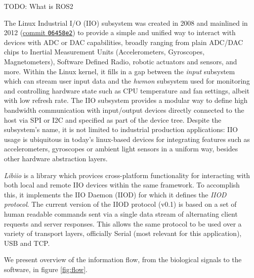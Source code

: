 \documentclass{thesis}
\newcommand{\todo}[1]{{\color{red}TODO: #1}}
\begin{document}
\todo{What is ROS2}

The Linux Industrial I/O (IIO) subsystem was created in 2008 and mainlined in 2012 (\href{https://github.com/torvalds/linux/commit/06458e277eac2b8761b0a04d3c808d57be281a2e}{commit \texttt{06458e2}}) to provide a simple and unified way to interact with devices with ADC or DAC capabilities, broadly ranging from plain ADC/DAC chips to Inertial Measurement Units (Accelerometers, Gyroscopes, Magnetometers), Software Defined Radio, robotic actuators and sensors, and more. Within the Linux kernel, it fills in a gap between the \textit{input} subsystem which can stream user input data and the \textit{hwmon} subsystem used for monitoring and controlling hardware state such as CPU temperature and fan settings, albeit with low refresh rate. The IIO subsystem provides a modular way to define high bandwidth communication with input/output devices directly connected to the host via SPI or I2C and specified as part of the device tree. Despite the subsystem's name, it is not limited to industrial production applications: IIO usage is ubiquitous in today's linux-based devices for integrating features such as accelerometers, gyroscopes or ambient light sensors in a uniform way, besides other hardware abstraction layers.

\textit{Libiio} is a library which provices cross-platform functionality for interacting with both local and remote IIO devices within the same framework. To accomplish this, it implements the IIO Daemon (IIOD) for which it defines the \textit{IIOD protocol}. The current version of the IIOD protocol (v0.1) is based on a set of human readable commands sent via a single data stream of alternating client requests and server responses. This allows the same protocol to be used over a variety of transport layers, officially Serial (most relevant for this application), USB and TCP.

We present overview of the information flow, from the biological signals to the software, in figure \ref{fig:flow}.
\end{document}
